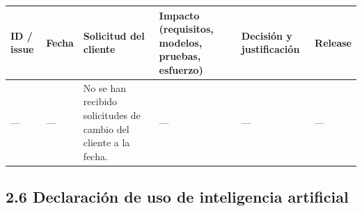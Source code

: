 {\def\LTcaptype{none} %
\begin{longtable}[]{@{}
  >{\raggedright\arraybackslash}p{}
  >{\raggedright\arraybackslash}p{}
  >{\raggedright\arraybackslash}p{}
  >{\raggedright\arraybackslash}p{}
  >{\raggedright\arraybackslash}p{}
  >{\raggedright\arraybackslash}p{}@{}}
\toprule\noalign{}
\begin{minipage}[b]{\linewidth}\raggedright
\textbf{ID / issue}
\end{minipage} & \begin{minipage}[b]{\linewidth}\raggedright
\textbf{Fecha}
\end{minipage} & \begin{minipage}[b]{\linewidth}\raggedright
\textbf{Solicitud del cliente}
\end{minipage} & \begin{minipage}[b]{\linewidth}\raggedright
\textbf{Impacto (requisitos, modelos, pruebas, esfuerzo)}
\end{minipage} & \begin{minipage}[b]{\linewidth}\raggedright
\textbf{Decisión y justificación}
\end{minipage} & \begin{minipage}[b]{\linewidth}\raggedright
\textbf{Release}
\end{minipage} \\
\midrule\noalign{}
\endhead
\bottomrule\noalign{}
\endlastfoot
--- & --- & No se han recibido solicitudes de cambio del cliente a la
fecha. & --- & --- & --- \\
\end{longtable}
}

\subsection{2.6 Declaración de uso de inteligencia
artificial}\label{declaraciuxf3n-de-uso-de-inteligencia-artificial}

